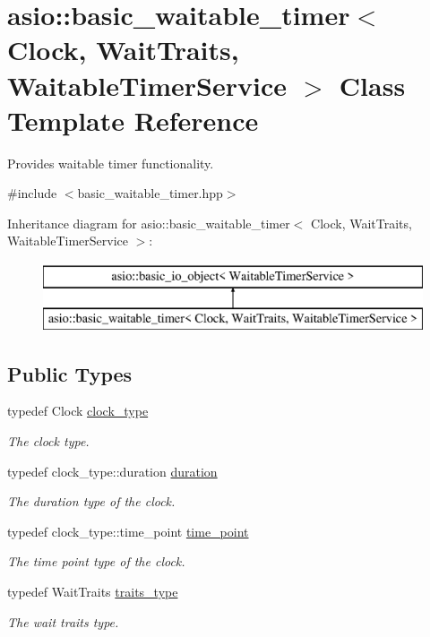 \hypertarget{classasio_1_1basic__waitable__timer}{}\section{asio\+:\+:basic\+\_\+waitable\+\_\+timer$<$ Clock, Wait\+Traits, Waitable\+Timer\+Service $>$ Class Template Reference}
\label{classasio_1_1basic__waitable__timer}


Provides waitable timer functionality.  




{\ttfamily \#include $<$basic\+\_\+waitable\+\_\+timer.\+hpp$>$}

Inheritance diagram for asio\+:\+:basic\+\_\+waitable\+\_\+timer$<$ Clock, Wait\+Traits, Waitable\+Timer\+Service $>$\+:\begin{figure}[H]
\begin{center}
\leavevmode
\includegraphics[height=2.000000cm]{classasio_1_1basic__waitable__timer}
\end{center}
\end{figure}
\subsection*{Public Types}
\begin{DoxyCompactItemize}
\item 
typedef Clock \hyperlink{classasio_1_1basic__waitable__timer_a1b74d12daabb5d3791f7aa42a7bdbd11}{clock\+\_\+type}
\begin{DoxyCompactList}\small\item\em The clock type. \end{DoxyCompactList}\item 
typedef clock\+\_\+type\+::duration \hyperlink{classasio_1_1basic__waitable__timer_a3ab0ae5bdf928106cd6ea19fcd4f5d49}{duration}
\begin{DoxyCompactList}\small\item\em The duration type of the clock. \end{DoxyCompactList}\item 
typedef clock\+\_\+type\+::time\+\_\+point \hyperlink{classasio_1_1basic__waitable__timer_a6f5aadc1aba86956b544ce107cfb49b0}{time\+\_\+point}
\begin{DoxyCompactList}\small\item\em The time point type of the clock. \end{DoxyCompactList}\item 
typedef Wait\+Traits \hyperlink{classasio_1_1basic__waitable__timer_a8b15c2ab0b8daa7a932ac8bed5fe5540}{traits\+\_\+type}
\begin{DoxyCompactList}\small\item\em The wait traits type. \end{DoxyCompactList}\end{DoxyCompactItemize}
